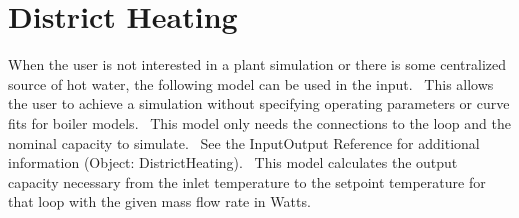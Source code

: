 \section{District Heating }\label{district-heating}

When the user is not interested in a plant simulation or there is some centralized source of hot water, the following model can be used in the input.~ This allows the user to achieve a simulation without specifying operating parameters or curve fits for boiler models.~ This model only needs the connections to the loop and the nominal capacity to simulate.~ See the InputOutput Reference for additional information (Object: DistrictHeating).~ This model calculates the output capacity necessary from the inlet temperature to the setpoint temperature for that loop with the given mass flow rate in Watts.
